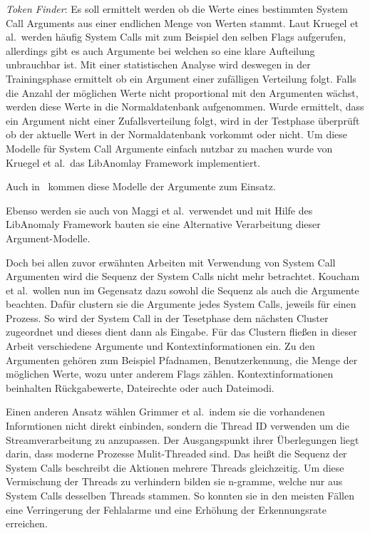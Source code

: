         \textit{Token Finder}: Es soll ermittelt werden ob die Werte eines bestimmten System Call Arguments aus einer endlichen Menge von Werten stammt.
        Laut Kruegel et al.\ werden häufig System Calls mit zum Beispiel den selben Flags aufgerufen, allerdings gibt es auch Argumente bei welchen so eine klare Aufteilung unbrauchbar ist.
        Mit einer statistischen Analyse wird deswegen in der Trainingsphase ermittelt ob ein Argument einer zufälligen Verteilung folgt.
        Falls die Anzahl der möglichen Werte nicht proportional mit den Argumenten wächst, werden diese Werte in die Normaldatenbank aufgenommen.
        Wurde ermittelt, dass ein Argument nicht einer Zufallsverteilung folgt, wird in der Testphase überprüft ob der aktuelle Wert in der Normaldatenbank vorkommt oder nicht.
        Um diese Modelle für System Call Argumente einfach nutzbar zu machen wurde von Kruegel et al.\ das LibAnomlay Framework implementiert.~\cite{ARGUMENTS}

        Auch in~\cite{ARGUMENTS2} kommen diese Modelle der Argumente zum Einsatz.
        
        Ebenso werden sie auch von Maggi et al.\ verwendet und mit Hilfe des LibAnomaly Framework bauten sie eine Alternative Verarbeitung dieser Argument-Modelle.~\cite{MAGGI}

        Doch bei allen zuvor erwähnten Arbeiten mit Verwendung von System Call Argumenten wird die Sequenz der System Calls nicht mehr betrachtet.
        Koucham et al.\ wollen nun im Gegensatz dazu sowohl die Sequenz als auch die Argumente beachten.
        Dafür clustern sie die Argumente jedes System Calls, jeweils für einen Prozess.
        So wird der System Call in der Tesetphase dem nächsten Cluster zugeordnet und dieses dient dann als Eingabe.
        Für das Clustern fließen in dieser Arbeit verschiedene Argumente und Kontextinformationen ein.
        Zu den Argumenten gehören zum Beispiel Pfadnamen, Benutzerkennung, die Menge der möglichen Werte, wozu unter anderem Flags zählen.
        Kontextinformationen beinhalten Rückgabewerte, Dateirechte oder auch Dateimodi.~\cite{ARGUMENTCLUSTERKOUCHAM2015}

        Einen anderen Ansatz wählen Grimmer et al.\ indem sie die vorhandenen Informtionen nicht direkt einbinden, sondern die Thread ID verwenden um die Streamverarbeitung zu anzupassen.
        Der Ausgangspunkt ihrer Überlegungen liegt darin, dass moderne Prozesse Mulit-Threaded sind.
        Das heißt die Sequenz der System Calls beschreibt die Aktionen mehrere Threads gleichzeitig.
        Um diese Vermischung der Threads zu verhindern bilden sie n-gramme, welche nur aus System Calls desselben Threads stammen.
        So konnten sie in den meisten Fällen eine Verringerung der Fehlalarme und eine Erhöhung der Erkennungsrate erreichen.\cite{IDSTHREADGRIMMER2021}

